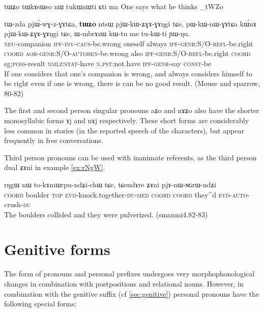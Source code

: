 \documentclass[oldfontcommands,oneside,a4paper,11pt]{memoir}
\newcommand{\ipa}[1]{{\phon #1}} %
\newcommand{\aor}{\textsc{aor}}
\newcommand{\auto}{\textsc{autoben}}
\newcommand{\caus}{\textsc{caus}}
\newcommand{\coord}{\textsc{coord}}
\newcommand{\const}{\textsc{const}}
\newcommand{\genr}{\textsc{genr}}
\newcommand{\inv}{\textsc{inv}}
\newcommand{\ipf}{\textsc{ipf}}
\newcommand{\neu}{\textsc{neu}}
\newcommand{\nmlz}{\textsc{nmlz}}
\newcommand{\npst}{\textsc{n.pst}}
\newcommand{\poss}{\textsc{poss}}
\newcommand{\refl}{\textsc{refl}}
\newcommand{\stat}{\textsc{stat}}
\begin{document}
tɯʑo tɯkɤsɯso nɯ tukɯnɯti ɕti ma
One says what he thinks
\ipa{8_tWZo}

\begin{exe}
\ex
\gll 
\ipa{tɯ-zda} \ipa{pjɯ́-wɣ-z-ɣɤtɕa,} \textbf{\ipa{tɯʑo}}  \ipa{ntsɯ}  \ipa{pjɯ-kɯ-ʑɣɤ-ɣɤŋgi}   	\ipa{tɕe,}  \ipa{pɯ-kɯ-nɯ-ɣɤtɕa} 	\ipa{kɯ́nɤ}   	\ipa{pjɯ-kɯ-ʑɣɤ-ɣɤŋgi}   	\ipa{tɕe,}    \ipa{ɯ-mbrɤzɯ}   	\ipa{kɯ-tu}   	\ipa{me}  	\ipa{tu-kɯ-ti}   	\ipa{ɲɯ-ŋu.}   \\
\neu{}-companion \ipf{}-\inv{}-\caus{}-be.wrong oneself always \ipf{}-\genr{}:S/O-\refl{}-be.right \coord{} \aor{}-\genr{}:S/O-\auto{}-be.wrong also \ipf{}-\genr{}:S/O-\refl{}-be.right \coord{} \3sg{};\poss{}-result \nmlz{}:\stat{}-have \npst{}:not.have \ipf{}-\genr-say \const{}-be \\
\glt  If one considers that one's companion is wrong, and always considers himself to be right even if one is wrong, there is can be no good result. (Mouse and sparrow, 80-82)
\end{exe} 


The first and second person singular pronouns  \ipa{aʑo} and \ipa{nɤʑo} also have the shorter monosyllabic forms \ipa{ɤj} and \ipa{nɤj} respectively. These short forms are considerably less common in stories (in the reported speech of the characters), but appear frequently in free conversations.


Third person pronouns can be used with inanimate referents, as the third person dual \ipa{ʑɤni} in example \ref{ex:rNgW}.
\begin{exe}
\ex \label{ex:rNgW}
\gll \ipa{tɕe}   	\ipa{rŋgɯ}   	\ipa{nɯ}   	\ipa{to-kɤmɯrpu-ndʑi-chɯ}   	\ipa{tɕe,}   	\ipa{tɕendɤre}   	\ipa{ʑɤni}   	\ipa{pjɤ-nɯ-ɴɢrɯ-ndʑi}   \\
\textsc{coord} boulder \textsc{top} \textsc{evd}-knock.together-\textsc{du-med} \textsc{coord} \textsc{coord} they^{d} \textsc{evd-auto}-crush-\textsc{du} \\
\glt The boulders collided and they were pulverized. (smanmi4.82-83)
\end{exe}




\section{Genitive forms} \label{sec:pronouns.gen}
The form of pronouns and personal prefixes undergoes very morphophonological changes in combination with postpositions and relational nouns. However, in combination with the genitive suffix  (cf \ref{sec:genitive})  personal pronouns have the following special forms:
\end{document}
